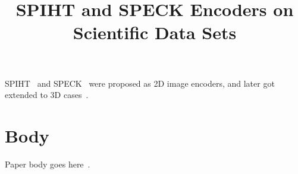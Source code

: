 \documentclass[review]{vgtc}                 %
\title{SPIHT and SPECK Encoders on Scientific Data Sets}
\begin{document}

\maketitle

\label{sec:intro}
%
SPIHT~\cite{said1996new} and SPECK~\cite{pearlman2004efficient} 
were proposed as 2D image encoders,
and later got extended to 3D cases~\cite{kim1997embedded, tang2006three}. 

\section{Body}
%
Paper body goes here~\cite{clyne2007interactive}.



\end{document}
